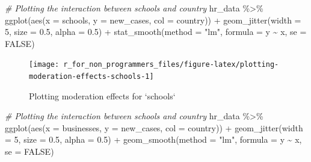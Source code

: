 \documentclass[
]{book}
\newenvironment{Shaded}{\begin{snugshade}}{\end{snugshade}}
\newcommand{\AttributeTok}[1]{\textcolor[rgb]{0.77,0.63,0.00}{#1}}
\newcommand{\CommentTok}[1]{\textcolor[rgb]{0.56,0.35,0.01}{\textit{#1}}}
\newcommand{\ConstantTok}[1]{\textcolor[rgb]{0.00,0.00,0.00}{#1}}
\newcommand{\DecValTok}[1]{\textcolor[rgb]{0.00,0.00,0.81}{#1}}
\newcommand{\FloatTok}[1]{\textcolor[rgb]{0.00,0.00,0.81}{#1}}
\newcommand{\FunctionTok}[1]{\textcolor[rgb]{0.00,0.00,0.00}{#1}}
\newcommand{\NormalTok}[1]{#1}
\newcommand{\SpecialCharTok}[1]{\textcolor[rgb]{0.00,0.00,0.00}{#1}}
\newcommand{\StringTok}[1]{\textcolor[rgb]{0.31,0.60,0.02}{#1}}
\begin{document}
\begin{Shaded}
\begin{Highlighting}[]
\CommentTok{\# Plotting the interaction between schools and country}
\NormalTok{hr\_data }\SpecialCharTok{\%\textgreater{}\%}
  \FunctionTok{ggplot}\NormalTok{(}\FunctionTok{aes}\NormalTok{(}\AttributeTok{x =}\NormalTok{ schools,}
             \AttributeTok{y =}\NormalTok{ new\_cases,}
             \AttributeTok{col =}\NormalTok{ country)) }\SpecialCharTok{+}
  \FunctionTok{geom\_jitter}\NormalTok{(}\AttributeTok{width =} \DecValTok{5}\NormalTok{,}
              \AttributeTok{size =} \FloatTok{0.5}\NormalTok{,}
              \AttributeTok{alpha =} \FloatTok{0.5}\NormalTok{) }\SpecialCharTok{+}
  \FunctionTok{stat\_smooth}\NormalTok{(}\AttributeTok{method =} \StringTok{"lm"}\NormalTok{,}
              \AttributeTok{formula =}\NormalTok{ y }\SpecialCharTok{\textasciitilde{}}\NormalTok{ x,}
              \AttributeTok{se =} \ConstantTok{FALSE}\NormalTok{)}
\end{Highlighting}
\end{Shaded}

\begin{figure}

{\centering \texttt{[image: r\_for\_non\_programmers\_files/figure-latex/plotting-moderation-effects-schools-1]} 

}

\caption{Plotting moderation effects for `schools`}\label{fig:plotting-moderation-effects-schools}
\end{figure}

\begin{Shaded}
\begin{Highlighting}[]
\CommentTok{\# Plotting the interaction between schools and country}
\NormalTok{hr\_data }\SpecialCharTok{\%\textgreater{}\%}
  \FunctionTok{ggplot}\NormalTok{(}\FunctionTok{aes}\NormalTok{(}\AttributeTok{x =}\NormalTok{ businesses,}
             \AttributeTok{y =}\NormalTok{ new\_cases,}
             \AttributeTok{col =}\NormalTok{ country)) }\SpecialCharTok{+}
  \FunctionTok{geom\_jitter}\NormalTok{(}\AttributeTok{width =} \DecValTok{5}\NormalTok{,}
              \AttributeTok{size =} \FloatTok{0.5}\NormalTok{,}
              \AttributeTok{alpha =} \FloatTok{0.5}\NormalTok{) }\SpecialCharTok{+}
  \FunctionTok{geom\_smooth}\NormalTok{(}\AttributeTok{method =} \StringTok{"lm"}\NormalTok{,}
              \AttributeTok{formula =}\NormalTok{ y }\SpecialCharTok{\textasciitilde{}}\NormalTok{ x,}
              \AttributeTok{se =} \ConstantTok{FALSE}\NormalTok{)}
\end{Highlighting}
\end{Shaded}
\end{document}
